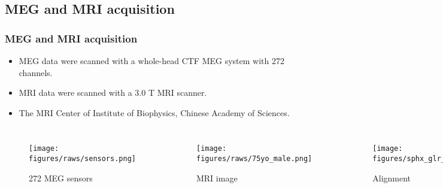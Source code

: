 \documentclass[aspectratio=169]{beamer}
\begin{document}
\subsection{MEG and MRI acquisition}
\begin{frame}
    \frametitle{MEG and MRI acquisition}

    \begin{itemize}
        \item MEG data were scanned with a whole-head CTF MEG system with 272 channels.
        \item MRI data were scanned with a 3.0 T MRI scanner.
        \item The MRI Center of Institute of Biophysics, Chinese Academy of Sciences.
    \end{itemize}

    \begin{columns}
        \begin{figure}[h]
            \centering
            \texttt{[image: figures/raws/sensors.png]}
            \caption{272 MEG sensors}
        \end{figure}

        \begin{figure}[h]
            \centering
            \texttt{[image: figures/raws/75yo\_male.png]}
            \caption{MRI image}
        \end{figure}

        \begin{figure}[h]
            \centering
            \texttt{[image: figures/sphx\_glr\_plot\_eeg\_no\_mri\_001.png]}
            \caption{Alignment}
        \end{figure}

    \end{columns}

\end{frame}

\end{document}

